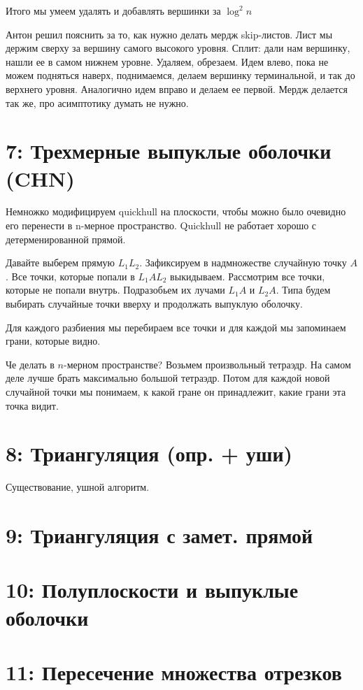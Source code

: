 \documentclass[11pt]{article}
\begin{document}
Итого мы умеем удалять и добавлять вершинки за $\log^2{n}$


Антон решил пояснить за то, как нужно делать мердж skip-листов. Лист
мы держим сверху за вершину самого высокого уровня. Сплит: дали нам
вершинку, нашли ее в самом нижнем уровне. Удаляем, обрезаем. Идем
влево, пока не можем подняться наверх, поднимаемся, делаем вершинку
терминальной, и так до верхнего уровня. Аналогично идем вправо и
делаем ее первой. Мердж делается так же, про асимптотику думать не
нужно.
\section{{\bfseries{}} 7:  Трехмерные выпуклые оболочки (CHN)}
\label{sec-9}
Немножко модифицируем quickhull на плоскости, чтобы можно было
очевидно его перенести в n-мерное пространство. Quickhull не
работает хорошо с детерменированной прямой.

Давайте выберем прямую $L_1L_2$. Зафиксируем в надмножестве случайную
точку $A$. Все точки, которые попали в $L_1AL_2$
выкидываем. Рассмотрим все точки, которые не попали
внутрь. Подразобьем их лучами $L_1A$ и $L_2A$. Типа будем выбирать
случайные точки вверху и продолжать выпуклую оболочку.

Для каждого разбиения мы перебираем все точки и для каждой мы
запоминаем грани, которые видно.

Че делать в $n$-мерном пространстве? Возьмем произвольный
тетраэдр. На самом деле лучше брать максимально большой
тетраэдр. Потом для каждой новой случайной точки мы понимаем, к
какой гране он принадлежит, какие грани эта точка видит.
\section{{\bfseries{}} 8:  Триангуляция (опр. + уши)}
\label{sec-10}
Существование, ушной алгоритм.
\section{{\bfseries{}} 9:  Триангуляция с замет. прямой}
\label{sec-11}
\section{{\bfseries{}} 10: Полуплоскости и выпуклые оболочки}
\label{sec-12}
\section{{\bfseries{}} 11: Пересечение множества отрезков}
\label{sec-13}
\end{document}
